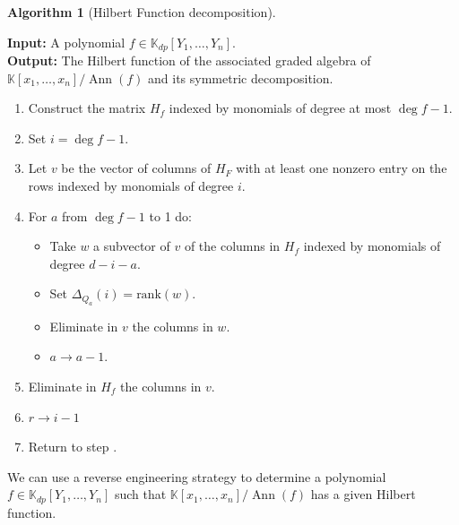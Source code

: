 \documentclass[a4paper,11p]{amsart}
\newtheorem{alg}{Algorithm}
\newcommand{\K}{\mathbb K}
\begin{document}
\vspace{0.5cm}
\begin{mdframed}[]
\begin{alg}[Hilbert Function decomposition]\label{alg:SymmetricHF}\end{alg}
\vspace{0.1cm}
\noindent\textbf{Input:} A polynomial $f\in \K_{dp}[Y_1,\ldots, Y_n]$. \\
    \textbf{Output:} The Hilbert function of the associated graded algebra of \\ $\K[x_1,\ldots, x_n]/\operatorname{Ann}(f)$ and its symmetric decomposition.

\begin{enumerate}
    \item Construct the matrix $H_{f}$ indexed by monomials of degree at most $\deg f-1$.
    \item Set $i=\deg f-1$.
    \item\label{alg: item: i} Let $v$ be the vector of columns of $H_F$ with at least one nonzero entry on the rows indexed by monomials of degree $i$.  
    
    \item  For $a$ from $\deg f-1$ to 1 do: 
    \begin{itemize}
        \item Take $w$ a subvector of $v$ of the columns in $H_f$ indexed by monomials of degree $d-i-a$.
        \item Set $\Delta_{Q_a}(i)=\text{rank}(w)$.
        \item Eliminate in $v$ the columns in $w$.
        \item $a\to a-1$.        
        \end{itemize}
        \item Eliminate in $H_f$ the columns in $v$.
        \item $r\to i-1$
        \item Return to step .
        
    \end{enumerate}
\end{mdframed}
\vspace{0.5cm}

\sloppy We can use a reverse engineering strategy to determine a polynomial $f\in \K_{dp}[Y_1,\ldots, Y_n]$ such that $\K[x_1,\ldots, x_n]/\operatorname{Ann}(f)$ has a given Hilbert function. 
\end{document}
